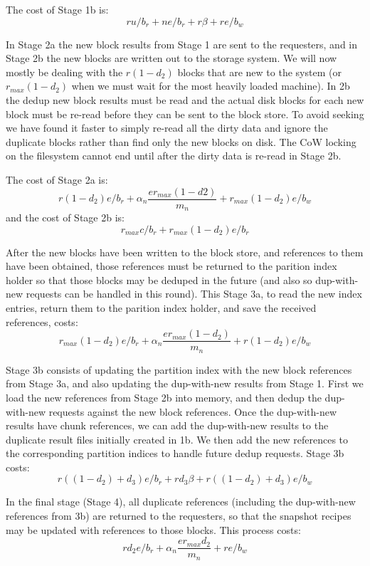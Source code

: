 The cost of Stage 1b is:
\[
    r u / b_r + n e / b_r + r \beta + r e / b_w
\]

In Stage 2a the new block results from Stage 1 are sent to the requesters, and
in Stage 2b the new blocks are written out to the storage system. We will now
mostly be dealing with the $r(1-d_2)$ blocks that are new to the system (or
$r_{max}(1-d_2)$ when we must wait for the most heavily loaded machine). In 2b
the dedup new block results must be read and the actual disk blocks for each
new block
must be re-read before they can be sent to the block store. To avoid seeking
we have found it faster to simply re-read all the dirty data and ignore the
duplicate blocks rather than find only the new blocks on disk. The CoW locking
on the filesystem cannot end until after the dirty data is re-read in Stage 2b.

The cost of Stage 2a is:
\[
    r(1-d_2)e / b_r + \alpha_n\frac{e r_{max}(1-d2)}{m_n} + r_{max}(1-d_2)e / b_w
\]
and the cost of Stage 2b is:
\[
    r_{max}c / b_r + r_{max}(1-d_2)e / b_r%
\]

After the new blocks have been written to the block store, and references to
them have been obtained, those references must be returned to the parition
index holder so that those blocks may be deduped in the future (and also so
dup-with-new requests can be handled in this round). This Stage 3a, to read the
new index entries, return them to the parition index holder, and save the
received references, costs:
\[
    r_{max} (1-d_2)e / b_r + \alpha_n\frac{e r_{max}(1-d_2)}{m_n} + r(1-d_2)e / b_w
\]

Stage 3b consists of updating the partition index with the new block references
from Stage 3a, and also updating the dup-with-new results from Stage 1. First
we load the new references from Stage 2b into memory, and then dedup the
dup-with-new requests against the new block references. Once the dup-with-new
results have chunk references, we can add the dup-with-new results to the
duplicate result files initially created in 1b. We then add the new references
to the corresponding
partition indices to handle future dedup requests. Stage 3b costs:
\[
    r ((1-d_2) + d_3)e/b_r + r d_3\beta + r((1-d_2) + d_3)e / b_w
\]

In the final stage (Stage 4), all duplicate references (including the
dup-with-new references from 3b) are returned to the requesters, so that the
snapshot recipes may be updated with references to those blocks. This process
costs:
\[
    r d_2 e / b_r + \alpha_n\frac{e r_{max} d_2}{m_n} + r e / b_w
\]


